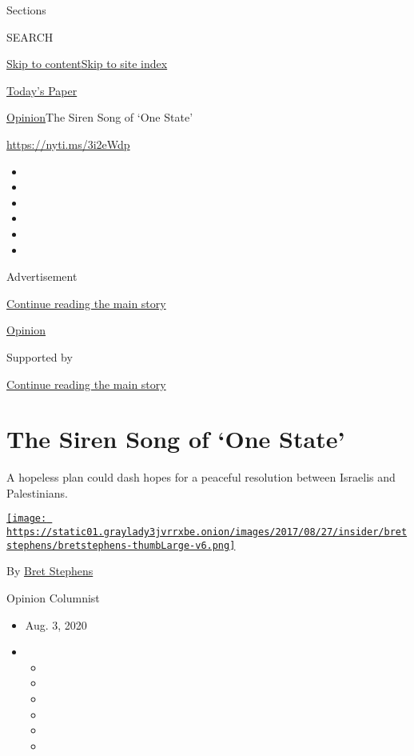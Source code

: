 Sections

SEARCH

\protect\hyperlink{site-content}{Skip to
content}\protect\hyperlink{site-index}{Skip to site index}

\href{https://myaccount.nytimes3xbfgragh.onion/auth/login?response_type=cookie\&client_id=vi}{}

\href{https://www.nytimes3xbfgragh.onion/section/todayspaper}{Today's
Paper}

\href{/section/opinion}{Opinion}\textbar{}The Siren Song of `One State'

\url{https://nyti.ms/3i2eWdp}

\begin{itemize}
\item
\item
\item
\item
\item
\item
\end{itemize}

Advertisement

\protect\hyperlink{after-top}{Continue reading the main story}

\href{/section/opinion}{Opinion}

Supported by

\protect\hyperlink{after-sponsor}{Continue reading the main story}

\hypertarget{the-siren-song-of-one-state}{%
\section{The Siren Song of `One
State'}\label{the-siren-song-of-one-state}}

A hopeless plan could dash hopes for a peaceful resolution between
Israelis and Palestinians.

\href{https://www.nytimes3xbfgragh.onion/by/bret-stephens}{\texttt{[image: https://static01.graylady3jvrrxbe.onion/images/2017/08/27/insider/bretstephens/bretstephens-thumbLarge-v6.png]}}

By \href{https://www.nytimes3xbfgragh.onion/by/bret-stephens}{Bret
Stephens}

Opinion Columnist

\begin{itemize}
\item
  Aug. 3, 2020
\item
  \begin{itemize}
  \item
  \item
  \item
  \item
  \item
  \item
  \end{itemize}
\end{itemize}

